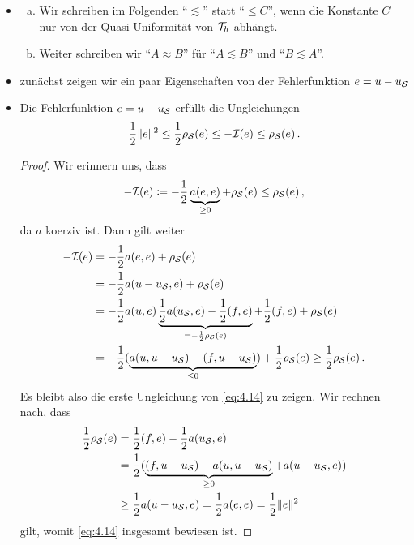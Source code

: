 \begin{itemize}
\item 
\begin{notation}
\begin{enumerate}[(a)]
\item Wir schreiben im Folgenden "`$\lesssim$"' statt "`$\le C$"', wenn die Konstante $C$ nur von der Quasi-Uniformität von $\mathcal T_h$ abhängt.
\item Weiter schreiben wir "`$A \approx B$"' für "`$A\lesssim B$"' und "`$B \lesssim A$"'.
\end{enumerate}
\end{notation}

\item zunächst zeigen wir ein paar Eigenschaften von der Fehlerfunktion $e = u-u_{\mathcal S}$

\item
\begin{lemma}\label{lem:4.13}
Die Fehlerfunktion $e = u-u_{\mathcal S}$ erfüllt die Ungleichungen
\begin{align}\label{eq:4.14}
	\frac 12 \lVert e\rVert^2 \le \frac 12 \rho_{\mathcal S}(e) \le -\mathcal I (e) \le \rho_{\mathcal S}(e) \, .
\end{align}
\end{lemma}

\begin{proof}
Wir erinnern uns, dass
\[
	-\mathcal I (e) \coloneqq - \frac 12 \underbrace{a(e,e)}_{\ge 0} + \rho_{\mathcal S} (e) \le \rho_{\mathcal S}(e) \, , 
\]
da $a$ koerziv ist. Dann gilt weiter
\begin{align*}
	-\mathcal I(e) & = - \frac 12 a(e,e) + \rho_{\mathcal S} (e) \\
	& = -\frac 1 2 a(u-u_{\mathcal S},e) + \rho_{\mathcal S} (e) \\
	& = -\frac 1 2 a(u,e) \underbrace{\frac 1 2 a(u_{\mathcal S},e)-\frac 1 2(f,e)}_{=-\frac 12 \rho_{\mathcal S}(e)} + \frac 1 2 (f,e)+\rho_{\mathcal S}(e) \\
	& = -\frac 12 (\underbrace{a(u,u-u_{\mathcal S})-(f,u-u_{\mathcal S})}_{\le 0}) + \frac 1 2\rho_{\mathcal S}(e) \ge \frac 1 2\rho_{\mathcal S}(e) \, .
\end{align*}
Es bleibt also die erste Ungleichung von \eqref{eq:4.14} zu zeigen. Wir rechnen nach, dass
\begin{align*}
	\frac 1 2 \rho_{\mathcal S} (e) &= \frac 1 2 (f,e)-\frac 1 2a(u_{\mathcal S},e) \\
	& = \frac 1 2 (\underbrace{(f,u-u_{\mathcal S}) - a(u,u-u_{\mathcal S})}_{\ge 0} + a(u-u_{\mathcal S},e)) \\
	& \ge \frac 1 2 a(u-u_{\mathcal S},e) =\frac 1 2 a(e,e) =  \frac 1 2 \lVert e\rVert^2 
\end{align*}
gilt, womit \eqref{eq:4.14} insgesamt bewiesen ist.
\end{proof}


\end{itemize}
